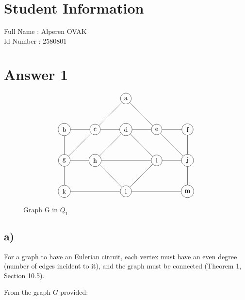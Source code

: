 \documentclass[12pt]{article}
\begin{document}
\section*{Student Information } 
Full Name :  Alperen OVAK\\
Id Number :  2580801\\

\section*{Answer 1}

\begin{figure}[H] 
    \[
\begin{tikzpicture}[scale=0.8]
    \node[circle,draw] (a) at (0,4) {a};
    \node[circle,draw] (b) at (-4,2) {b};
    \node[circle,draw] (c) at (-2,2) {c};
    \node[circle,draw] (d) at (0,2) {d};
    \node[circle,draw] (e) at (2,2) {e};
    \node[circle,draw] (f) at (4,2) {f};
    \node[circle,draw] (g) at (-4,0) {g};
    \node[circle,draw] (h) at (-2,0) {h};
    \node[circle,draw] (i) at (2,0) {i};
    \node[circle,draw] (j) at (4,0) {j};
    \node[circle,draw] (k) at (-4,-2) {k};
    \node[circle,draw] (l) at (0,-2) {l};
    \node[circle,draw] (m) at (4,-2) {m};
    \draw (a) -- (e) -- (j);
    \draw (a) -- (c) -- (g);
    \draw (d) -- (h) -- (l) -- (i) -- (d);
    \draw (b) -- (g) -- (k);
    \draw (f) -- (j) -- (m);
    \draw (b) -- (c) -- (d) -- (e) -- (f);
    \draw (g) -- (h) -- (i) -- (j);
    \draw (k) -- (l) -- (m);
\end{tikzpicture}
\]
\caption{Graph G in \(Q_1\)}
\end{figure}

\subsection*{a)}

For a graph to have an Eulerian circuit, each vertex must have an even degree (number of edges incident to it), and the graph must be connected (Theorem 1, Section 10.5).

From the graph \( G \) provided:
\end{document}
